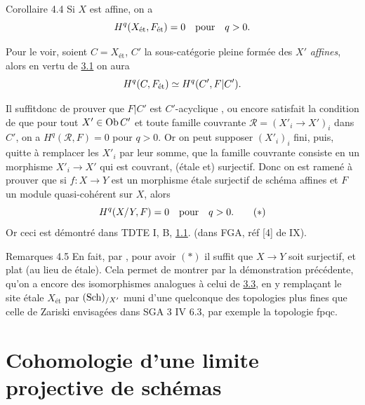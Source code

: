 \documentclass[10pt]{../fichiers-configuration-latex/smfart}
\begin{document}
\begin{enonce*}{Corollaire 4.4}
Si $X$ est affine, on a
$$
H^{q} (X_{\text{\rm ét}}, F_{\text{\rm ét}}) = 0\quad \mbox{pour}\quad q > 0{}.
$$
\end{enonce*}

Pour le voir, soient $C = X_{\text{ét}}$, $C'$ la sous-catégorie pleine
formée des $X'$ \emph{affines}, alors en vertu de \hyperref[VII.prop3.1]{3.1} on aura
$$
H^{q} (C, F_{\text{ét}}) \simeq H^{q} (C', F | C'){}.
$$

Il suffit\pageoriginale donc de prouver que $F | C'$ est
$C'$-acyclique , ou encore satisfait la condition de
 \ie que pour tout $X'\in \operatorname{Ob} C'$ et toute famille
couvrante $ℛ = (X'_{i} \to X')_i$ dans $C'$, on a $H^{q}
(ℛ, F) = 0$ pour $q > 0$. Or on peut supposer $(X'_{i})_{i}$
fini, puis, quitte à remplacer les $X'_{i}$ par leur somme, que la
famille couvrante consiste en un morphisme $X'_{i} \to X'$ qui est
couvrant, \ie (étale et) surjectif. Donc on est ramené à prouver que
si $f : X \to Y$ est un morphisme étale surjectif de schéma affines
et $F$ un module quasi-cohérent sur $X$, alors
\begin{equation*}
H^q (X /Y, F) = 0\quad \mbox{pour}\quad q > 0{}.\tag{$\ast$}
\end{equation*}
Or ceci est démontré dans TDTE I, B, \hyperref[VII.subsec1.1]{1.1}. (dans FGA, \cf réf [4] de
IX).

\begin{enonce*}[remark]{Remarques 4.5}
En fait, par \loccit, pour avoir $(\ast)$ il suffit que $X \to Y$ soit
surjectif, et plat (au lieu de étale). Cela permet de montrer par la
démonstration  précédente, qu'on a encore des isomorphismes analogues
à celui de \hyperref[VII.prop3.3]{3.3}, en y remplaçant le site étale $X_{\text{ét}}$ par
$(\operatorname{Sch})_{/X'}$ muni d'une quelconque des topologies plus fines que celle
de Zariski envisagées dans SGA 3 IV 6.3, par exemple la topologie fpqc.
\end{enonce*}

\section{Cohomologie d'une limite projective de schémas}

\subsection{}
\end{document}
